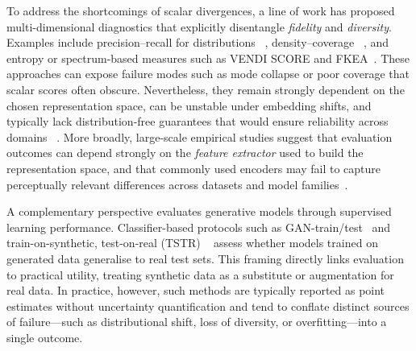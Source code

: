 To address the shortcomings of scalar divergences, a line of work has proposed
multi-dimensional diagnostics that explicitly disentangle \emph{fidelity} and
\emph{diversity}. Examples include precision--recall for distributions
~\citep{sajjadi2018assessing,kynkaanniemi2019improved}, density--coverage
~\citep{naeem2020reliable}, and entropy or spectrum-based measures such as VENDI SCORE and
FKEA~\citep{friedman2023vendi,pasarkar2024cousins,jalali2024fkea,luo2024converge}.
These approaches can expose failure modes such as mode collapse or poor coverage that
scalar scores often obscure. Nevertheless, they remain strongly dependent on the chosen
representation space, can be unstable under embedding shifts, and typically lack
distribution-free guarantees that would ensure reliability across domains
~\citep{parmar2022aliased,betzalel2024evaluation}. More broadly, large-scale empirical studies
suggest that evaluation outcomes can depend strongly on the \emph{feature extractor} used to build
the representation space, and that commonly used encoders may fail to capture perceptually relevant
differences across datasets and model families~\citep{stein2023exposing}.

A complementary perspective evaluates generative models through supervised learning
performance. Classifier-based protocols such as GAN-train/test~\citep{shmelkov2018good}
and train-on-synthetic, test-on-real (TSTR)
~\citep{hyland2017real,esteban2017real,yoon2019timegan} assess whether models trained on
generated data generalise to real test sets. This framing directly links evaluation to
practical utility, treating synthetic data as a substitute or augmentation for real data.
In practice, however, such methods are typically reported as point estimates without
uncertainty quantification and tend to conflate distinct sources of failure—such as
distributional shift, loss of diversity, or overfitting—into a single outcome.



